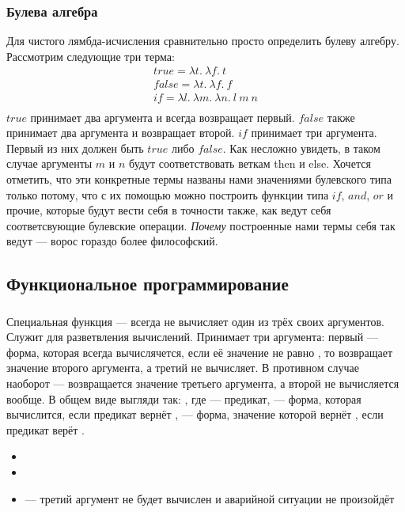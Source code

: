 \documentclass[a4paper, 12pt, titlepage, twoside]{article}
\newenvironment{examples}
               {\begin{itemize}\renewcommand{\labelitemi}{ }}
               {\end{itemize}}
\begin{document}
\subsubsection{Булева алгебра}
Для чистого лямбда-исчисления сравнительно просто определить булеву алгебру. Рассмотрим следующие три терма:
\[
\begin{array}{l}
  true = \lambda t.\ \lambda f.\ t\\
  false = \lambda t.\ \lambda f.\ f\\
  if = \lambda l.\ \lambda m.\ \lambda n.\ l\ m\ n\\
\end{array}
\]
  $true$ принимает два аргумента и всегда возвращает первый. $false$ также принимает два аргумента и возвращает второй. $if$ принимает три аргумента. Первый из них должен быть $true$ либо $false$. Как несложно увидеть, в таком случае аргументы $m$ и $n$ будут соответствовать веткам then и else. Хочется отметить, что эти конкретные термы названы нами значениями булевского типа только потому, что с их помощью можно построить функции типа $if$, $and$, $or$ и прочие, которые будут вести себя в точности также, как ведут себя соответсвующие булевские операции. \textit{Почему} построенные нами термы себя так ведут --- ворос гораздо более философский.
\subsection{Функциональное программирование}


\begin{verb}
\subsubsection{}
Специальная функция --- всегда не вычисляет один из трёх своих аргументов. Служит для разветвления вычислений. Принимает три аргумента: первый --- форма, которая всегда вычислячется, если её значение не равно , то  возвращает значение второго аргумента, а третий не вычисляет. В противном случае наоборот --- возвращается значение третьего аргумента, а второй не вычисляется вообще. В общем виде выгляди так: , где  --- предикат,  --- форма, которая вычислится, если предикат вернёт ,  --- форма, значение которой вернёт , если предикат верёт .
\begin{examples}
  \item {}
  \item {}
  \item {} --- третий аргумент не будет вычислен и аварийной ситуации не произойдёт
\end{examples}
\end{verb}
\end{document}
